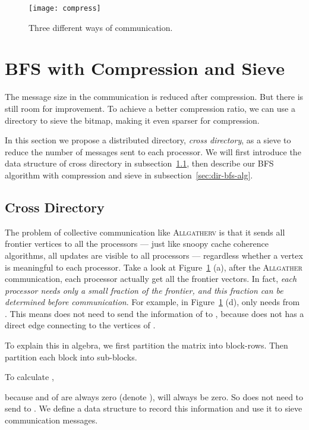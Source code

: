 \documentclass[conference]{IEEEtran}
\begin{document}
\begin{figure}[t]
  \centering
  \texttt{[image: compress]}
  \caption{Three different ways of communication.}
  \label{fig:compress}
\end{figure}

\section{BFS with Compression and Sieve}
\label{sec:dir-bfs}

The message size in the communication is reduced after compression. But there
is still room for improvement. To achieve a better compression ratio, we can
use a directory to sieve the bitmap, making it even sparser for compression.

In this section we propose a distributed directory, \textit{cross directory},
as a sieve to reduce the number of messages sent to each processor. We will
first introduce the data structure of cross directory in
subsection~\ref{sec:cross-dir}, then describe our BFS algorithm with
compression and sieve in subsection~\ref{sec:dir-bfs-alg}.

\subsection{Cross Directory}
\label{sec:cross-dir}

The problem of collective communication like \textsc{Allgatherv} is that it
sends all frontier vertices to all the processors --- just like snoopy cache
coherence algorithms, all updates are visible to all processors --- regardless
whether a vertex is meaningful to each processor. Take a look at
Figure~\ref{fig:compress} (a), after the \textsc{Allgather} communication,
each processor actually get all the frontier vectors. In fact, \emph{each
  processor needs only a small fraction of the frontier, and this fraction can
  be determined before communication}. For example, in
Figure~\ref{fig:compress} (d),  only needs  from . This means
 does not need to send the information of  to , because 
does not has a direct edge connecting to the vertices of .

To explain this in algebra, we first partition the matrix  into 
block-rows. Then partition each block  into  sub-blocks.


To calculate , 

because  and  of  are always zero (denote
),  will always be zero. So  does
not need to send  to . We define a data structure to record this
information and use it to sieve communication messages.
\end{document}
